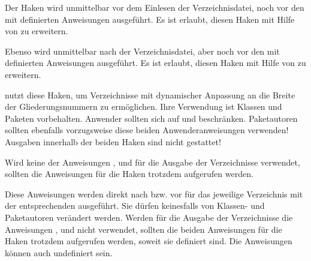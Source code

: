 \begin{Declaration}
\end{Declaration}
Der Haken  wird unmittelbar vor dem
Einlesen der Verzeichnisdatei, noch vor den mit
 definierten Anweisungen
ausgeführt. Es ist erlaubt, diesen Haken mit Hilfe von
 zu erweitern.

Ebenso wird  unmittelbar nach der
Verzeichnisdatei, aber noch vor den mit
 definierten Anweisungen
ausgeführt. Es ist erlaubt, diesen Haken mit Hilfe von
 zu erweitern.

\KOMAScript{} nutzt diese Haken, um Verzeichnisse mit dynamischer Anpassung an
die Breite der Gliederungsnummern zu ermöglichen. Ihre Verwendung ist Klassen
und Paketen vorbehalten. Anwender sollten sich auf
 und
 beschränken. Paketautoren sollten
ebenfalls vorzugsweise diese beiden Anwenderanweisungen verwenden!  Ausgaben
innerhalb der beiden Haken sind nicht gestattet!

Wird keine der Anweisungen
,  und
 für die Ausgabe der Verzeichnisse
verwendet, sollten die Anweisungen für die Haken trotzdem
aufgerufen werden.%
\EndIndexGroup


\begin{Declaration}
\end{Declaration}
Diese Anweisungen werden direkt nach
 bzw. vor
 für das jeweilige Verzeichnis
mit der entsprechenden 
ausgeführt. Sie  dürfen keinesfalls von Klassen- und
Paketautoren verändert werden. Werden für die Ausgabe der Verzeichnisse die
Anweisungen ,
 und 
nicht verwendet, sollten die beiden Anweisungen für die Haken
trotzdem aufgerufen werden, soweit sie definiert sind. Die Anweisungen können
auch undefiniert sein.%
%
\EndIndexGroup


